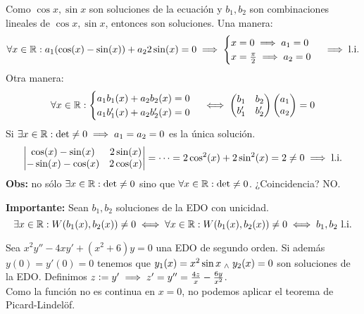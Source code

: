 Como $\cos{x}, \sin{x}$ son soluciones de la ecuación y $b_1, b_2$ son combinaciones lineales de $\cos{x}, \sin{x}$, entonces son soluciones.
Una manera: \[\forall x \in \mathbb{R} : a_1(\cos(x) - \sin(x)) + a_2 2 \sin(x) = 0 \implies \begin{cases}
		x= 0 \implies a_1 = 0 \\
		x= \frac{\pi}{2} \implies a_2 = 0
	\end{cases}\implies \text{l.i.}\]
Otra manera:
\[\forall x \in \mathbb{R} : \begin{cases}
		a_1b_1(x) + a_2b_2(x) = 0 \\
		a_1b_1'(x) + a_2b_2'(x) = 0
	\end{cases} \iff \begin{pmatrix}
		b_1  & b_2  \\
		b_1' & b_2'
	\end{pmatrix} \begin{pmatrix}
		a_1 \\
		a_2
	\end{pmatrix} = 0\]
Si $\exists x \in \mathbb{R} : \det \neq 0 \implies a_1 = a_2 = 0$ es la única solución.
\[\begin{vmatrix}
		\cos(x) - \sin(x)  & 2\sin(x) \\
		-\sin(x) - \cos(x) & 2\cos(x)
	\end{vmatrix} = \cdots = 2\cos^2(x) + 2\sin^2(x) = 2 \neq 0 \implies \text{l.i.}\]
\textbf{Obs:} no sólo $\exists x\in \mathbb{R} : \det \neq 0$ sino que $\forall x \in \mathbb{R} : \det \neq 0$. ¿Coincidencia? NO.

\textbf{Importante:} Sean $b_1, b_2$ soluciones de la EDO con unicidad.
\[\exists x \in \mathbb{R} : W(b_1(x), b_2(x)) \neq 0 \iff \forall x \in \mathbb{R} : W(b_1(x), b_2(x)) \neq 0 \iff b_1, b_2 \text{ l.i.}\]

Sea $x^2y'' - 4xy'+(x^2+6)y = 0$ una EDO de segundo orden. Si además $y(0) = y'(0) = 0$ tenemos que $y_1(x)=x^2\sin{x} \; _{\wedge} \; y_2(x)= 0$ son soluciones de la EDO. Definimos $z\vcentcolon= y' \implies z' = y'' = \frac{4z}{x} - \frac{6y}{x^2}$.\\

Como la función no es continua en $x=0$, no podemos aplicar el teorema de Picard-Lindelöf.